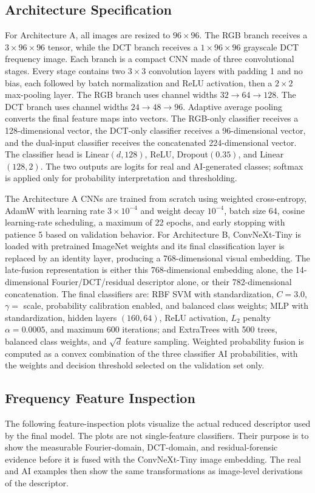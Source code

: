 ﻿\documentclass[10pt,twocolumn]{article}
\begin{document}
\subsection{Architecture Specification}
For Architecture A, all images are resized to \(96\times96\). The RGB branch receives a \(3\times96\times96\) tensor, while the DCT branch receives a \(1\times96\times96\) grayscale DCT frequency image. Each branch is a compact CNN made of three convolutional stages. Every stage contains two \(3\times3\) convolution layers with padding 1 and no bias, each followed by batch normalization and ReLU activation, then a \(2\times2\) max-pooling layer. The RGB branch uses channel widths \(32\rightarrow64\rightarrow128\). The DCT branch uses channel widths \(24\rightarrow48\rightarrow96\). Adaptive average pooling converts the final feature maps into vectors. The RGB-only classifier receives a 128-dimensional vector, the DCT-only classifier receives a 96-dimensional vector, and the dual-input classifier receives the concatenated 224-dimensional vector. The classifier head is Linear\((d,128)\), ReLU, Dropout\((0.35)\), and Linear\((128,2)\). The two outputs are logits for real and AI-generated classes; softmax is applied only for probability interpretation and thresholding.

The Architecture A CNNs are trained from scratch using weighted cross-entropy, AdamW with learning rate \(3\times10^{-4}\) and weight decay \(10^{-4}\), batch size 64, cosine learning-rate scheduling, a maximum of 22 epochs, and early stopping with patience 5 based on validation behavior. For Architecture B, ConvNeXt-Tiny is loaded with pretrained ImageNet weights and its final classification layer is replaced by an identity layer, producing a 768-dimensional visual embedding. The late-fusion representation is either this 768-dimensional embedding alone, the 14-dimensional Fourier/DCT/residual descriptor alone, or their 782-dimensional concatenation. The final classifiers are: RBF SVM with standardization, \(C=3.0\), \(\gamma=\) scale, probability calibration enabled, and balanced class weights; MLP with standardization, hidden layers \((160,64)\), ReLU activation, \(L_2\) penalty \(\alpha=0.0005\), and maximum 600 iterations; and ExtraTrees with 500 trees, balanced class weights, and \(\sqrt{d}\) feature sampling. Weighted probability fusion is computed as a convex combination of the three classifier AI probabilities, with the weights and decision threshold selected on the validation set only.

\subsection{Frequency Feature Inspection}
The following feature-inspection plots visualize the actual reduced descriptor used by the final model. The plots are not single-feature classifiers. Their purpose is to show the measurable Fourier-domain, DCT-domain, and residual-forensic evidence before it is fused with the ConvNeXt-Tiny image embedding. The real and AI examples then show the same transformations as image-level derivations of the descriptor.
\end{document}
